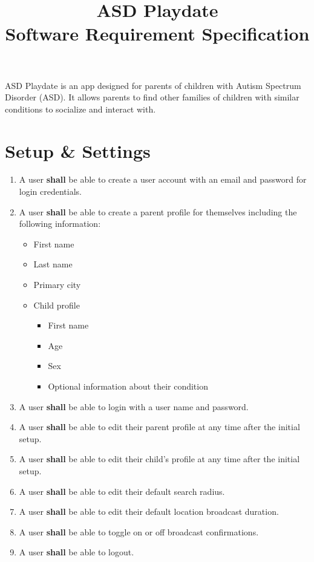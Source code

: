 \documentclass{article}
\begin{document}
\title{ASD Playdate\\Software Requirement Specification}
\date{}
\maketitle

\noindent ASD Playdate is an app designed for parents of children with Autism Spectrum Disorder (ASD). It allows parents to find other families of children with similar conditions to socialize and interact with.

\section*{Setup \& Settings}
	\begin{enumerate}
		\item A user \textbf{shall} be able to create a user account with an email and password for login credentials.
		\item A user \textbf{shall} be able to create a parent profile for themselves including the following information:
			\begin{itemize}
				\item First name
				\item Last name
				\item Primary city
				\item Child profile
				\begin{itemize}
					\item First name
					\item Age
					\item Sex
					\item Optional information about their condition
				\end{itemize}
			\end{itemize}
		\item A user \textbf{shall} be able to login with a user name and password.
		\item A user \textbf{shall} be able to edit their parent profile at any time after the initial setup.
		\item A user \textbf{shall} be able to edit their child's profile at any time after the initial setup.
		\item A user \textbf{shall} be able to edit their default search radius.
		\item A user \textbf{shall} be able to edit their default location broadcast duration.
		\item A user \textbf{shall} be able to toggle on or off broadcast confirmations.
		\item A user \textbf{shall} be able to logout.
		\setcounter{enumTemp}{\theenumi}
	\end{enumerate}
\end{document}
